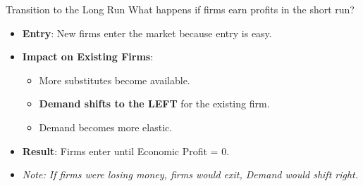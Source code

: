 \documentclass[aspectratio=169]{beamer}
\begin{document}
\begin{frame}{Transition to the Long Run}
    What happens if firms earn profits in the short run?
    \vspace{0.5cm}
    \begin{itemize}
        \item<1-> \textbf{Entry}: New firms enter the market because entry is easy.
        \item<2-> \textbf{Impact on Existing Firms}: 
            \begin{itemize}
                \item More substitutes become available.
                \item \textbf{Demand shifts to the LEFT} for the existing firm.
                \item Demand becomes more elastic.
            \end{itemize}
        \item<3-> \textbf{Result}: Firms enter until Economic Profit = 0.
        \item<4-> \textit{Note: If firms were losing money, firms would exit, Demand would shift right.}
    \end{itemize}
\end{frame}
\end{document}
